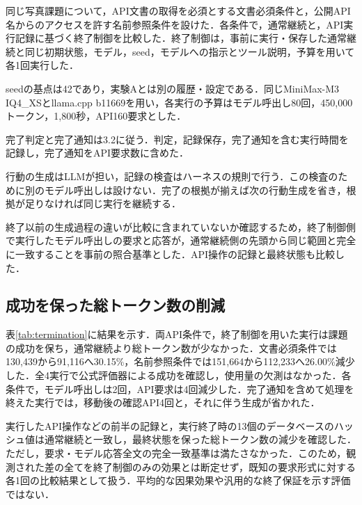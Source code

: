 \documentclass[letter]{ieicej}
\begin{document}
同じ写真課題について，API文書の取得を必須とする文書必須条件と，公開API名からのアクセスを許す名前参照条件を設けた．各条件で，通常継続と，API実行記録に基づく終了制御を比較した．終了制御は，事前に実行・保存した通常継続と同じ初期状態，モデル，seed，モデルへの指示とツール説明，予算を用いて各1回実行した．

seedの基点は42であり，実験Aとは別の履歴・設定である．同じMiniMax-M3 IQ4\_XSとllama.cpp b11669を用い，各実行の予算はモデル呼出し80回，450,000トークン，1,800秒，API160要求とした．

完了判定と完了通知は3.2に従う．判定，記録保存，完了通知を含む実行時間を記録し，完了通知をAPI要求数に含めた．

行動の生成はLLMが担い，記録の検査はハーネスの規則で行う．この検査のために別のモデル呼出しは設けない．完了の根拠が揃えば次の行動生成を省き，根拠が足りなければ同じ実行を継続する．

終了以前の生成過程の違いが比較に含まれていないか確認するため，終了制御側で実行したモデル呼出しの要求と応答が，通常継続側の先頭から同じ範囲と完全に一致することを事前の照合基準とした．API操作の記録と最終状態も比較した．

\subsection{成功を保った総トークン数の削減}

表\ref{tab:termination}に結果を示す．両API条件で，終了制御を用いた実行は課題の成功を保ち，通常継続より総トークン数が少なかった．文書必須条件では130,439から91,116へ30.15\%，名前参照条件では151,664から112,233へ26.00\%減少した．全4実行で公式評価器による成功を確認し，使用量の欠測はなかった．各条件で，モデル呼出しは2回，API要求は4回減少した．完了通知を含めて処理を終えた実行では，移動後の確認API4回と，それに伴う生成が省かれた．

\TerminationResultsTable

\par\noindent\begin{minipage}{\columnwidth}
実行したAPI操作などの前半の記録と，実行終了時の13個のデータベースのハッシュ値は通常継続と一致し，最終状態を保った総トークン数の減少を確認した．ただし，要求・モデル応答全文の完全一致基準は満たさなかった．このため，観測された差の全てを終了制御のみの効果とは断定せず，既知の要求形式に対する各1回の比較結果として扱う．平均的な因果効果や汎用的な終了保証を示す評価ではない．
\end{minipage}\par{}
\end{document}
